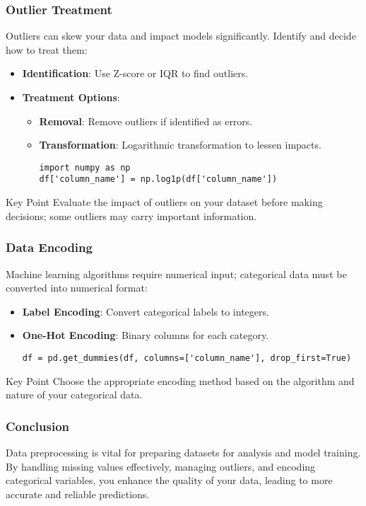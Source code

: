 \documentclass[aspectratio=169]{beamer}
\begin{document}
\begin{frame}[fragile]
    \frametitle{Outlier Treatment}
    Outliers can skew your data and impact models significantly. Identify and decide how to treat them:
    \begin{itemize}
        \item \textbf{Identification}: Use Z-score or IQR to find outliers.
        \item \textbf{Treatment Options}:
            \begin{itemize}
                \item \textbf{Removal}: Remove outliers if identified as errors.
                \item \textbf{Transformation}: Logarithmic transformation to lessen impacts.
                \begin{lstlisting}
import numpy as np
df['column_name'] = np.log1p(df['column_name'])
                \end{lstlisting}
            \end{itemize}
    \end{itemize}
    \begin{block}{Key Point}
        Evaluate the impact of outliers on your dataset before making decisions; some outliers may carry important information.
    \end{block}
\end{frame}

\begin{frame}[fragile]
    \frametitle{Data Encoding}
    Machine learning algorithms require numerical input; categorical data must be converted into numerical format:
    \begin{itemize}
        \item \textbf{Label Encoding}: Convert categorical labels to integers.
        \item \textbf{One-Hot Encoding}: Binary columns for each category.
            \begin{lstlisting}
df = pd.get_dummies(df, columns=['column_name'], drop_first=True)
            \end{lstlisting}
    \end{itemize}
    \begin{block}{Key Point}
        Choose the appropriate encoding method based on the algorithm and nature of your categorical data.
    \end{block}
\end{frame}

\begin{frame}
    \frametitle{Conclusion}
    Data preprocessing is vital for preparing datasets for analysis and model training. By handling missing values effectively, managing outliers, and encoding categorical variables, you enhance the quality of your data, leading to more accurate and reliable predictions.
\end{frame}
\end{document}
